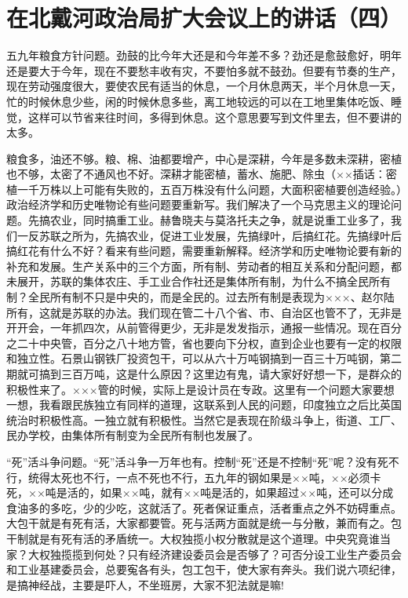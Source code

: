 \section[在北戴河政治局扩大会议上的讲话（四）（一九五八年八月二十一日下午）]{在北戴河政治局扩大会议上的讲话（四）}


五九年粮食方针问题。劲鼓的比今年大还是和今年差不多？劲还是愈鼓愈好，明年还是要大于今年，现在不要愁丰收有灾，不要怕多就不鼓劲。但要有节奏的生产，现在劳动强度很大，要使农民有适当的休息，一个月休息两天，半个月休息一天，忙的时候休息少些，闲的时候休息多些，离工地较远的可以在工地里集体吃饭、睡觉，这样可以节省来往时间，多得到休息。这个意思要写到文件里去，但不要讲的太多。

粮食多，油还不够。粮、棉、油都要增产，中心是深耕，今年是多数未深耕，密植也不够，太密了不通风也不好。深耕才能密植，蓄水、施肥、除虫（××插话：密植一千万株以上可能有失败的，五百万株没有什么问题，大面积密植要创造经验。）政治经济学和历史唯物论有些问题要重新写。我们解决了一个马克思主义的理论问题。先搞农业，同时搞重工业。赫鲁晓夫与莫洛托夫之争，就是说重工业多了，我们一反苏联之所为，先搞农业，促进工业发展，先搞绿叶，后搞红花。先搞绿叶后搞红花有什么不好？看来有些问题，需要重新解释。经济学和历史唯物论要有新的补充和发展。生产关系中的三个方面，所有制、劳动者的相互关系和分配问题，都未展开，苏联的集体农庄、手工业合作社还是集体所有制，为什么不搞全民所有制？全民所有制不只是中央的，而是全民的。过去所有制是表现为×××、赵尔陆所有，这就是苏联的办法。我们现在管二十八个省、市、自治区也管不了，无非是开开会，一年抓四次，从前管得更少，无非是发发指示，通报一些情况。现在百分之二十中央管，百分之八十地方管，省也要向下分权，直到企业也要有一定的权限和独立性。石景山钢铁厂投资包干，可以从六十万吨钢搞到一百三十万吨钢，第二期就可搞到三百万吨，这是什么原因？这里边有鬼，请大家好好想一下，是群众的积极性来了。×××管的时候，实际上是设计员在专政。这里有一个问题大家要想一想，我看跟民族独立有同样的道理，这联系到人民的问题，印度独立之后比英国统治时积极性高。一独立就有积极性。当然它是表现在阶级斗争上，街道、工厂、民办学校，由集体所有制变为全民所有制也发展了。

“死”活斗争问题。“死”活斗争一万年也有。控制“死”还是不控制“死”呢？没有死不行，统得太死也不行，一点不死也不行，五九年的钢如果是××吨，××必须卡死，××吨是活的，如果××吨，就有××吨是活的，如果超过××吨，还可以分成食油多的多吃，少的少吃，这就活了。死者保证重点，活者重点之外不妨碍重点。大包干就是有死有活，大家都要管。死与活两方面就是统一与分散，兼而有之。包干制就是有死有活的矛盾统一。大权独揽小权分散就是这个道理。中央究竟谁当家？大权独揽揽到何处？只有经济建设委员会是否够了？可否分设工业生产委员会和工业基建委员会，总要寃各有头，包工包干，使大家有奔头。我们说六项纪律，是搞神经战，主要是吓人，不坐班房，大家不犯法就是嘛!

